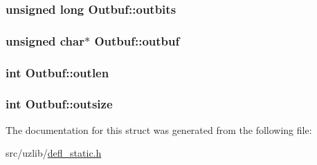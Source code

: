 \subsubsection[{\texorpdfstring{outbits}{outbits}}]{\setlength{\rightskip}{0pt plus 5cm}unsigned long Outbuf\+::outbits}\hypertarget{structOutbuf_ac2e004cb99bcfd2e064f78558ec6d451}{}\label{structOutbuf_ac2e004cb99bcfd2e064f78558ec6d451}
\subsubsection[{\texorpdfstring{outbuf}{outbuf}}]{\setlength{\rightskip}{0pt plus 5cm}unsigned char$\ast$ Outbuf\+::outbuf}\hypertarget{structOutbuf_acab7b3c6c932d62ab4013745fa06d988}{}\label{structOutbuf_acab7b3c6c932d62ab4013745fa06d988}
\subsubsection[{\texorpdfstring{outlen}{outlen}}]{\setlength{\rightskip}{0pt plus 5cm}int Outbuf\+::outlen}\hypertarget{structOutbuf_a6be82c0a4c7034071393ad2803eff07a}{}\label{structOutbuf_a6be82c0a4c7034071393ad2803eff07a}
\subsubsection[{\texorpdfstring{outsize}{outsize}}]{\setlength{\rightskip}{0pt plus 5cm}int Outbuf\+::outsize}\hypertarget{structOutbuf_a543a71c42713b6a3a5141e7ec91be329}{}\label{structOutbuf_a543a71c42713b6a3a5141e7ec91be329}


The documentation for this struct was generated from the following file\+:\begin{DoxyCompactItemize}
\item 
src/uzlib/\hyperlink{defl__static_8h}{defl\+\_\+static.\+h}\end{DoxyCompactItemize}
